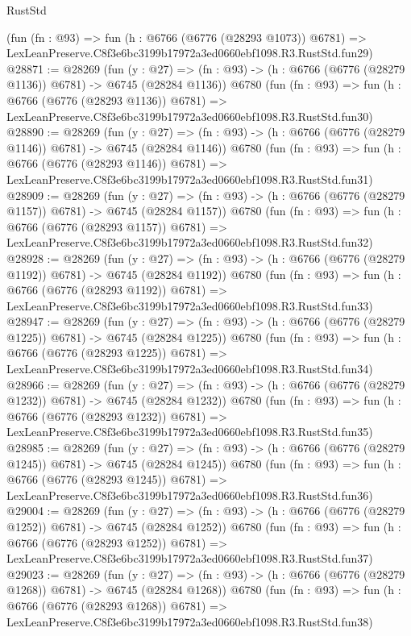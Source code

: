 \begin{lexlean}{RustStd}
\begin{coremodule}
    (fun (fn : @93) =>
    fun (h : @6766 (@6776 (@28293 @1073)) @6781) =>
    LexLeanPreserve.C8f3e6bc3199b17972a3ed0660ebf1098.R3.RustStd.fun29)
@28871 := @28269
    (fun (y : @27) =>
    (fn : @93) -> (h : @6766 (@6776 (@28279 @1136)) @6781) -> @6745 (@28284 @1136))
    @6780
    (fun (fn : @93) =>
    fun (h : @6766 (@6776 (@28293 @1136)) @6781) =>
    LexLeanPreserve.C8f3e6bc3199b17972a3ed0660ebf1098.R3.RustStd.fun30)
@28890 := @28269
    (fun (y : @27) =>
    (fn : @93) -> (h : @6766 (@6776 (@28279 @1146)) @6781) -> @6745 (@28284 @1146))
    @6780
    (fun (fn : @93) =>
    fun (h : @6766 (@6776 (@28293 @1146)) @6781) =>
    LexLeanPreserve.C8f3e6bc3199b17972a3ed0660ebf1098.R3.RustStd.fun31)
@28909 := @28269
    (fun (y : @27) =>
    (fn : @93) -> (h : @6766 (@6776 (@28279 @1157)) @6781) -> @6745 (@28284 @1157))
    @6780
    (fun (fn : @93) =>
    fun (h : @6766 (@6776 (@28293 @1157)) @6781) =>
    LexLeanPreserve.C8f3e6bc3199b17972a3ed0660ebf1098.R3.RustStd.fun32)
@28928 := @28269
    (fun (y : @27) =>
    (fn : @93) -> (h : @6766 (@6776 (@28279 @1192)) @6781) -> @6745 (@28284 @1192))
    @6780
    (fun (fn : @93) =>
    fun (h : @6766 (@6776 (@28293 @1192)) @6781) =>
    LexLeanPreserve.C8f3e6bc3199b17972a3ed0660ebf1098.R3.RustStd.fun33)
@28947 := @28269
    (fun (y : @27) =>
    (fn : @93) -> (h : @6766 (@6776 (@28279 @1225)) @6781) -> @6745 (@28284 @1225))
    @6780
    (fun (fn : @93) =>
    fun (h : @6766 (@6776 (@28293 @1225)) @6781) =>
    LexLeanPreserve.C8f3e6bc3199b17972a3ed0660ebf1098.R3.RustStd.fun34)
@28966 := @28269
    (fun (y : @27) =>
    (fn : @93) -> (h : @6766 (@6776 (@28279 @1232)) @6781) -> @6745 (@28284 @1232))
    @6780
    (fun (fn : @93) =>
    fun (h : @6766 (@6776 (@28293 @1232)) @6781) =>
    LexLeanPreserve.C8f3e6bc3199b17972a3ed0660ebf1098.R3.RustStd.fun35)
@28985 := @28269
    (fun (y : @27) =>
    (fn : @93) -> (h : @6766 (@6776 (@28279 @1245)) @6781) -> @6745 (@28284 @1245))
    @6780
    (fun (fn : @93) =>
    fun (h : @6766 (@6776 (@28293 @1245)) @6781) =>
    LexLeanPreserve.C8f3e6bc3199b17972a3ed0660ebf1098.R3.RustStd.fun36)
@29004 := @28269
    (fun (y : @27) =>
    (fn : @93) -> (h : @6766 (@6776 (@28279 @1252)) @6781) -> @6745 (@28284 @1252))
    @6780
    (fun (fn : @93) =>
    fun (h : @6766 (@6776 (@28293 @1252)) @6781) =>
    LexLeanPreserve.C8f3e6bc3199b17972a3ed0660ebf1098.R3.RustStd.fun37)
@29023 := @28269
    (fun (y : @27) =>
    (fn : @93) -> (h : @6766 (@6776 (@28279 @1268)) @6781) -> @6745 (@28284 @1268))
    @6780
    (fun (fn : @93) =>
    fun (h : @6766 (@6776 (@28293 @1268)) @6781) =>
    LexLeanPreserve.C8f3e6bc3199b17972a3ed0660ebf1098.R3.RustStd.fun38)

\end{coremodule}
\end{lexlean}
